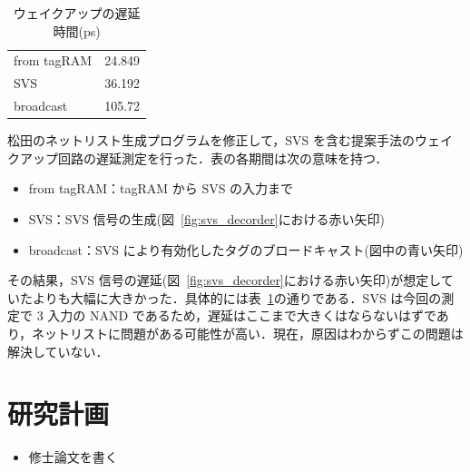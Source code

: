 \documentclass[twocolumn]{jsarticle}
\newcommand{\fig}[1]{{図~\ref{fig:#1}}}
\newcommand{\tab}[1]{{表~\ref{tab:#1}}}
\begin{document}
  \begin{table}[htb]
    \caption{ウェイクアップの遅延時間(ps)}
    \footnotesize
    \center
      \begin{tabular}{l|l} \hline \hline
       from tagRAM & 24.849 \\
       SVS & 36.192 \\
       broadcast & 105.72 \\ \hline
    \end{tabular}
    \label{tab:delay}
  \end{table}

  松田のネットリスト生成プログラムを修正して，SVS を含む提案手法のウェイクアップ回路の遅延測定を行った．表の各期間は次の意味を持つ．
  \begin{itemize}
    \item from tagRAM：tagRAM から SVS  の入力まで
    \item SVS：SVS 信号の生成(\fig{svs_decorder}における赤い矢印)
    \item broadcast：SVS により有効化したタグのブロードキャスト(図中の青い矢印) 
  \end{itemize}
  その結果，SVS 信号の遅延(\fig{svs_decorder}における赤い矢印)が想定していたよりも大幅に大きかった．具体的には\tab{delay}の通りである．SVS は今回の測定で 3 入力の NAND であるため，遅延はここまで大きくはならないはずであり，ネットリストに問題がある可能性が高い．現在，原因はわからずこの問題は解決していない．
  
  \section{研究計画}
  
  \begin{itemize}
    \item 修士論文を書く
  \end{itemize}
  
  
  
   
  
  
  
\end{document}
